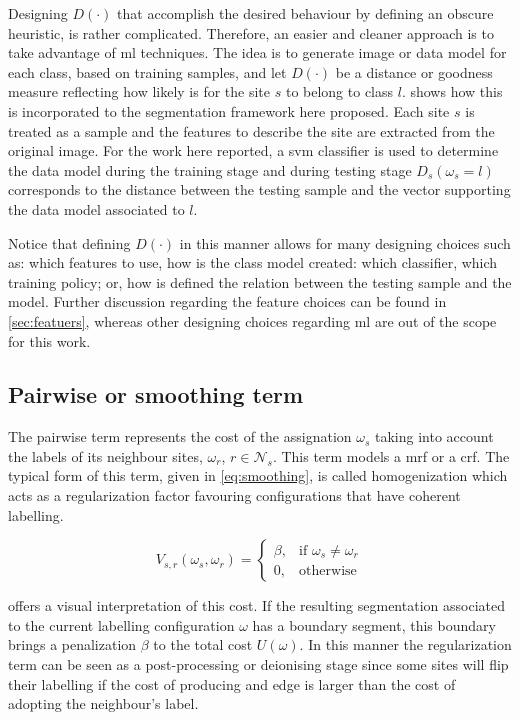 Designing $D(\cdot)$ that accomplish the desired behaviour by defining an obscure heuristic, is rather complicated. 
Therefore, an easier and cleaner approach is to take advantage of \ac{ml} techniques. 
The idea is to generate image or data model for each class, based on training samples, and let $D(\cdot)$ be a distance or goodness measure reflecting how likely is for the site $s$ to belong to class $l$.
 shows how this is incorporated to the segmentation framework here proposed.
Each site $s$ is treated as a sample and the features to describe the site are extracted from the original image. 
For the work here reported, a \ac{svm} classifier is used to determine the data model during the training stage and during testing stage $D_s(\omega_s=l)$ corresponds to the distance between the testing sample and the vector supporting the data model associated to $l$. 

Notice that defining $D(\cdot)$ in this manner allows for many designing choices such as: which features to use, how is the class model created: which classifier, which training policy; or, how is defined the relation between the testing sample and the model.
Further discussion regarding the feature choices can be found in \cref{sec:featuers}, whereas other designing choices regarding \ac{ml} are out of the scope for this work.

\subsection{Pairwise or smoothing term} \label{sec:method:mrfTerm}
 
The pairwise term represents the cost of the assignation $\omega_s$ taking into account the labels of its neighbour sites, $\omega_r$, $r \in \mathcal{N}_{s}$. 
This term models a \ac{mrf} or a \ac{crf}.
The typical form of this term, given in \cref{eq:smoothing}, is called homogenization which acts as a regularization factor favouring configurations that have coherent labelling.

\begin{equation}
V_{s,r}(\omega_s,\omega_r) = 
\begin{cases}
    \beta, & \text{if } \omega_s \ne \omega_r\\
    0,              & \text{otherwise}
\end{cases}
\label{eq:smoothing}
\end{equation}

 offers a visual interpretation of this cost.
If the resulting segmentation associated to the current labelling configuration $\omega$ has a boundary segment, this boundary brings a penalization $\beta$ to the total cost $U(\omega)$.
In this manner the regularization term can be seen as a post-processing or deionising stage since some sites will flip their labelling if the cost of producing and edge is larger than the cost of adopting the neighbour's label. 

